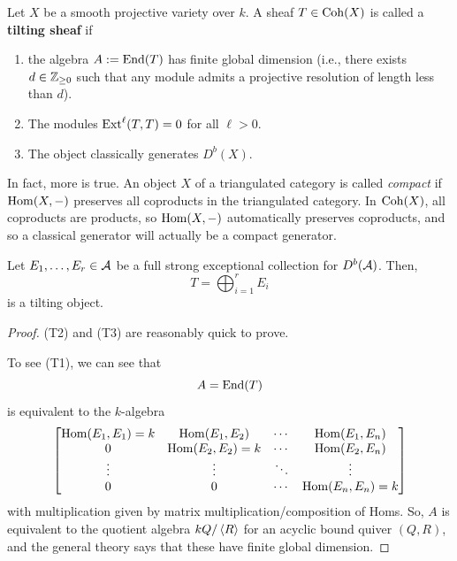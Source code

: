 \documentclass[12pt]{article}
\begin{document}
\begin{defn}
    Let $X$ be a smooth projective variety over $k$. A sheaf $T\in \operatorname{Coh}(X)$ is called a \textbf{tilting sheaf} if
    \begin{enumerate}
        \item[(T1)] the algebra $A:= \operatorname{End}(T)$ has finite global dimension (i.e., there exists $d\in \mathbb{Z}_{\geq 0}$ such that any module admits a projective resolution of length less than $d$).
        \item[(T2)] The modules $\mathrm{Ext}^\ell(T,T)=0$ for all $\ell>0$.
        \item[(T3)] The object classically generates $D^b(X)$.
    \end{enumerate}
\end{defn}

In fact, more is true. An object $X$ of a triangulated category is called \textit{compact} if $\mathrm{Hom}(X,-)$ preserves all coproducts in the triangulated category. In $\operatorname{Coh}(X)$, all coproducts are products, so $\mathrm{Hom}(X,-)$ automatically preserves coproducts, and so a classical generator will actually be a compact generator.

\begin{prop}
    Let $E_1,\dots,E_r \in \mathcal{A}$ be a full strong exceptional collection for $D^b(\mathcal{A})$. Then,
    \[T = \bigoplus_{i=1}^r E_i\]
    is a tilting object.
\end{prop}
\begin{proof}
    (T2) and (T3) are reasonably quick to prove.

    To see (T1), we can see that
    \[A = \operatorname{End}(T)\]
    is equivalent to the $k$-algebra
    \[\begin{bmatrix}
        \mathrm{Hom}(E_1,E_1)=k & \mathrm{Hom}(E_1,E_2) & \cdots & \mathrm{Hom}(E_1,E_n)\\
        0 & \mathrm{Hom}(E_2,E_2)=k & \cdots & \mathrm{Hom}(E_2,E_n)\\
        \vdots & \vdots & \ddots & \vdots\\
        0 & 0 & \cdots & \mathrm{Hom}(E_n,E_n)=k
    \end{bmatrix}\]
    with multiplication given by matrix multiplication/composition of Homs. So, $A$ is equivalent to the quotient algebra $kQ/\left\langle R\right\rangle$ for an acyclic bound quiver $(Q,R)$, and the general theory says that these have finite global dimension.
\end{proof}
\end{document}

